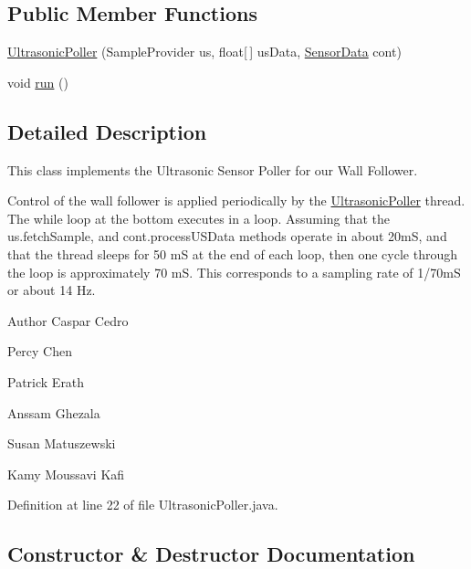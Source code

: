 \subsection*{Public Member Functions}
\begin{DoxyCompactItemize}
\item 
\hyperlink{classca_1_1mcgill_1_1ecse211_1_1sensors_1_1_ultrasonic_poller_a3007841893144cccb37d023f34fb3cfc}{Ultrasonic\+Poller} (Sample\+Provider us, float\mbox{[}$\,$\mbox{]} us\+Data, \hyperlink{classca_1_1mcgill_1_1ecse211_1_1sensors_1_1_sensor_data}{Sensor\+Data} cont)
\item 
void \hyperlink{classca_1_1mcgill_1_1ecse211_1_1sensors_1_1_ultrasonic_poller_acc71fac612a72c197244c71d6cf7b6e1}{run} ()
\end{DoxyCompactItemize}


\subsection{Detailed Description}
This class implements the Ultrasonic Sensor Poller for our Wall Follower.

Control of the wall follower is applied periodically by the \hyperlink{classca_1_1mcgill_1_1ecse211_1_1sensors_1_1_ultrasonic_poller}{Ultrasonic\+Poller} thread. The while loop at the bottom executes in a loop. Assuming that the us.\+fetch\+Sample, and cont.\+process\+U\+S\+Data methods operate in about 20mS, and that the thread sleeps for 50 mS at the end of each loop, then one cycle through the loop is approximately 70 mS. This corresponds to a sampling rate of 1/70mS or about 14 Hz.

\begin{DoxyAuthor}{Author}
Caspar Cedro 

Percy Chen 

Patrick Erath 

Anssam Ghezala 

Susan Matuszewski 

Kamy Moussavi Kafi 
\end{DoxyAuthor}


Definition at line 22 of file Ultrasonic\+Poller.\+java.



\subsection{Constructor \& Destructor Documentation}
\mbox{\label{classca_1_1mcgill_1_1ecse211_1_1sensors_1_1_ultrasonic_poller_a3007841893144cccb37d023f34fb3cfc}} 
